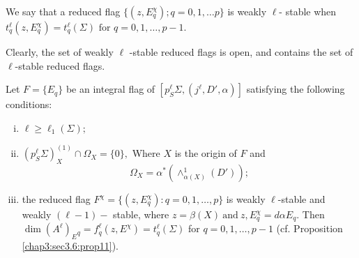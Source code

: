 \begin{defi*}
  We say that a reduced flag $ \big\{ (z,E^\chi _{q}) ; q=0 , 1,\ldots
  p\big\}$ is weakly $\ell $- stable when $t^\ell_q (z,E^\chi _{q})=
  t^\ell_q (\Sigma) \text { for } q=0,1,\ldots,p-1$.  

  Clearly, the set of weakly $\ell$ -stable reduced flags is open, and
  contains the set of $\ell$-stable reduced flags. 
\end{defi*}

\begin{proposition}\label{chap3:sec3.13:prop23}%
  Let $F= \big\{E_q\big\}$ be an integral flag of $[p_S^{\ell}\Sigma,
    (j^\ell,D',\alpha)]$ satisfying the following conditions:  
\end{proposition}

\begin{enumerate}[(i)]
\item $\ell \geq\ell_1 (\Sigma) ; $
\item $(p_S^{\ell}\Sigma)_X^{(1)} \cap \Omega_ X = \{0\}, $ Where $X$
  is the origin of $F$ and 
$$
\Omega_X = \alpha^* (\wedge^1_{\alpha (X)}
  (D'));
$$
 
\item the reduced flag $F^\chi = \{ (z,E^\chi _{q}): q=0,1,\ldots,p\}$
  is weakly $\ell$-stable and weakly $(\ell-1)-$ stable, where
  $z=\beta (X) ~\text{and}~ z,E^\chi _{q} = d \alpha E_q$. Then $\dim
  (A^\ell)_E{_q} = f_q^\ell (z, E^\chi) = t^\ell_q (\Sigma)$ for
  $q=0,1,\ldots,p-1$ (cf. Proposition \ref{chap3:sec3.6:prop11}).  
\end{enumerate}

